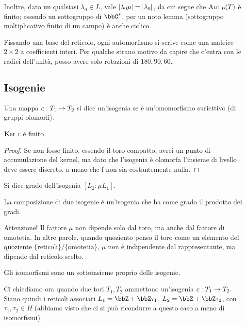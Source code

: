 	Inoltre, dato un qualsiasi $\lambda_0 \in L$, vale $\left| \lambda_0 \mu \right| = \left| \lambda_0 \right|$, da cui segue che $\text{Aut }_0(T)$ è finito; essendo un sottogruppo di $\bbC^*$, per un noto lemma (sottogruppo moltiplicativo finito di un campo) è anche ciclico.
	
	Fissando una base del reticolo, ogni automorfismo si scrive come una matrice $2 \times 2$ a coefficienti interi. Per qualche strano motivo da capire che c'entra con le radici dell'unità, %
	posso avere solo rotazioni di $180, 90, 60$.
	
	\subsection{Isogenie}
	\begin{definizione}
		Una mappa $c: T_1 \rightarrow T_2$ si dice un'isogenia se è un'omomorfismo suriettivo (di gruppi olomorfi).
	\end{definizione}
	
	\begin{proposizione}
		$\mbox{Ker } c$ è finito.
	\end{proposizione}
	\begin{proof}
		Se non fosse finito, essendo il toro compatto, avrei un punto di accumulazione del kernel, ma dato che l'isogenia è olomorfa l'insieme di livello deve essere discreto, a meno che f non sia costantemente nulla.
	\end{proof}
	
	\begin{definizione}
		Si dice grado dell'isogenia $[L_2 : \mu L_1]$.
        \end{definizione}
              
	\begin{osservazione}
		La composizione di due isogenie è un'isogenia che ha come grado il prodotto dei gradi.
	\end{osservazione}
	
	Attenzione! Il fattore $\mu$ non dipende solo dal toro, ma anche dal fattore di omotetia. In altre parole, quando quoziento penso il toro come un elemento del quoziente $\{ \mbox{reticoli} \} / \{ \mbox{omotetia} \}$, $\mu$ non è indipendente dal rappresentante, ma dipende dal reticolo scelto.
	
	\begin{osservazione} 
		Gli isomorfismi sono un sottoinsieme proprio delle isogenie.
	\end{osservazione}

	Ci chiediamo ora quando due tori $T_1, T_2$ ammettono un'isogenia $c: T_1 \rightarrow T_2$. Siano quindi i reticoli associati $L_1=\bbZ + \bbZ \tau_1$, $L_2=\bbZ + \bbZ \tau_2$, con $\tau_1,\tau_2 \in H$ (abbiamo visto che ci si può ricondurre a questo caso a meno di isomorfismi).
	
